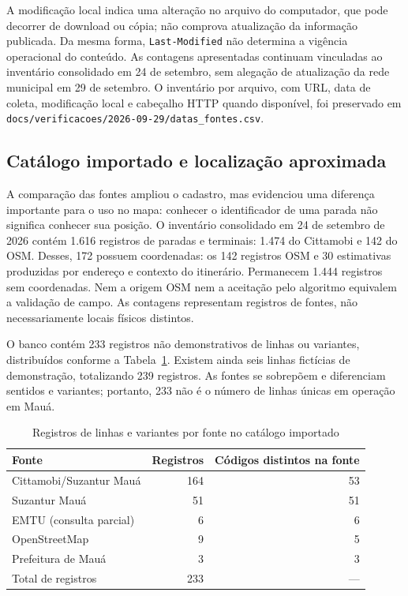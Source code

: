 \documentclass[12pt,oneside,a4paper,brazil]{abntex2}
\begin{document}
A modificação local indica uma alteração no arquivo do computador, que pode decorrer de download ou cópia; não comprova atualização da informação publicada. Da mesma forma, \texttt{Last-Modified} não determina a vigência operacional do conteúdo. As contagens apresentadas continuam vinculadas ao inventário consolidado em 24 de setembro, sem alegação de atualização da rede municipal em 29 de setembro. O inventário por arquivo, com URL, data de coleta, modificação local e cabeçalho HTTP quando disponível, foi preservado em \nolinkurl{docs/verificacoes/2026-09-29/datas_fontes.csv}.

\subsection{Catálogo importado e localização aproximada}
A comparação das fontes ampliou o cadastro, mas evidenciou uma diferença importante para o uso no mapa: conhecer o identificador de uma parada não significa conhecer sua posição. O inventário consolidado em 24 de setembro de 2026 contém 1.616 registros de paradas e terminais: 1.474 do Cittamobi e 142 do OSM. Desses, 172 possuem coordenadas: os 142 registros OSM e 30 estimativas produzidas por endereço e contexto do itinerário. Permanecem 1.444 registros sem coordenadas. Nem a origem OSM nem a aceitação pelo algoritmo equivalem a validação de campo. As contagens representam registros de fontes, não necessariamente locais físicos distintos.

O banco contém 233 registros não demonstrativos de linhas ou variantes, distribuídos conforme a Tabela~\ref{tab:catalogo}. Existem ainda seis linhas fictícias de demonstração, totalizando 239 registros. As fontes se sobrepõem e diferenciam sentidos e variantes; portanto, 233 não é o número de linhas únicas em operação em Mauá.

\begin{table}[htbp]
\centering
\caption{Registros de linhas e variantes por fonte no catálogo importado}
\label{tab:catalogo}
\begin{tabular}{lrr}
\hline
Fonte & Registros & Códigos distintos na fonte \\
\hline
Cittamobi/Suzantur Mauá & 164 & 53 \\
Suzantur Mauá & 51 & 51 \\
EMTU (consulta parcial) & 6 & 6 \\
OpenStreetMap & 9 & 5 \\
Prefeitura de Mauá & 3 & 3 \\
\hline
Total de registros & 233 & --- \\
\hline
\end{tabular}
\end{table}
\end{document}
